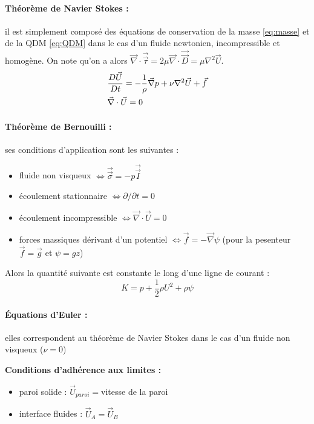 \paragraph{Théorème de Navier Stokes :}il est simplement composé des équations de conservation de la masse \eqref{eq:masse} et de la QDM \eqref{eq:QDM} dans le cas d'un fluide newtonien, incompressible et homogène. On note qu'on a alors $\vec{\nabla} \cdot \vec{\vec{\tau}} = 2 \mu \vec{\nabla} \cdot \vec{\vec{D}} = \mu \nabla^2 \vec{U}$.
%
\begin{align}[left=\empheqlbrace]
 & \frac{D\vec{U}}{Dt} = - \frac{1}{\rho} \vec{\nabla} p + \nu  \nabla^2 \vec{U} + \vec{f} \\
 \notag & \vec{\nabla} \cdot \vec{U} = 0
\end{align}


\paragraph{Théorème de Bernouilli :}ses conditions d'application sont les suivantes :

\begin{itemize}\renewcommand{\labelitemi}{$\bullet$}
    \item fluide non visqueux
    $\Leftrightarrow \vec{\vec{\sigma}}=-p\vec{\vec{I}}$
    \item écoulement stationnaire
    $\Leftrightarrow \partial{}/\partial{t} = 0$
    \item écoulement incompressible
    $\Leftrightarrow \vec{\nabla} \cdot \vec{U} = 0$
    \item forces massiques dérivant d'un potentiel
    $\Leftrightarrow\vec{f} = - \vec{\nabla} \psi$ (pour la pesenteur $\vec{f} = \vec{g}$ et $\psi = g z$)
\end{itemize}
%
Alors la quantité suivante est constante le long d'une ligne de courant :
%
\begin{equation}
K = p + \frac{1}{2}\rho U^2 + \rho\psi
\end{equation}

\paragraph{Équations d'Euler :}elles correspondent au théorème de Navier Stokes dans le cas d'un fluide non visqueux ($\nu=0$)

\textbf{Conditions d'adhérence aux limites :}
\begin{itemize}\renewcommand{\labelitemi}{$\bullet$}
 \item paroi solide : $\vec{U}_{paroi}=$vitesse de la paroi
 \item interface fluides : $\vec{U}_A=\vec{U}_B$
\end{itemize}

